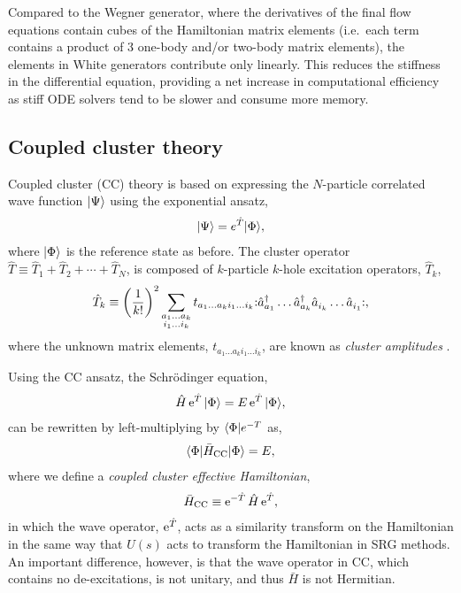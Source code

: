Compared to the Wegner generator, where the derivatives of the final flow equations contain cubes of the Hamiltonian matrix elements (i.e.\ each term contains a product of 3 one-body and/or two-body matrix elements), the elements in White generators contribute only linearly.  This reduces the stiffness in the differential equation, providing a net increase in computational efficiency as stiff ODE solvers tend to be slower and consume more memory.

\subsection{Coupled cluster theory}
\label{subsec:cctheory}

Coupled cluster (CC) theory is based on expressing the $N$-particle correlated wave function $| \Psi \rangle$ using the exponential ansatz,
\begin{align*}
  | \Psi \rangle = e^{\hat{T}} | \Phi \rangle,
\end{align*}
where $| \Phi \rangle$ is the reference state as before.  The cluster operator $\hat{T} \equiv \hat{T}_1 + \hat{T}_2 + \cdots + \hat{T}_N$, is composed of $k$-particle $k$-hole excitation operators, $\hat{T}_k$,
\begin{align} \label{eq:cc_amps}
  \hat{T}_k \equiv \left(\frac{1}{k!}\right)^2 \sum_{\substack{a_1 \ldots a_k \\ i_1 \ldots i_k}} t_{a_1 \ldots a_k i_1 \ldots i_k} \mathopen: \hat{a}_{a_1}^\dagger \ldots \hat{a}_{a_k}^\dagger \hat a_{i_k}^{} \ldots \hat{a}_{i_1}^{} \mathclose:,
\end{align}
where the unknown matrix elements, $t_{a_1 \ldots a_k i_1 \ldots i_k}$, are known as \textit{cluster amplitudes} \cite{shavitt2009many}.

Using the CC ansatz, the Schr\"odinger equation,
\begin{align} \label{eq:cc_schrodeq}
  \hat{H} \operatorname{e}^{\hat{T}} | \Phi \rangle = E \operatorname{e}^{\hat{T}} | \Phi \rangle,
\end{align}
can be rewritten by left-multiplying by $\langle \Phi |e^{-T}$ as,
\begin{align*}
  \langle \Phi | \bar{H}_{\mathrm{CC}} | \Phi \rangle = E,
\end{align*}
where we define a \textit{coupled cluster effective Hamiltonian},
\begin{align} \label{eq:cc_heff0}
  \bar{H}_{\mathrm{CC}} \equiv \operatorname{e}^{-\hat{T}} \hat{H} \operatorname{e}^{\hat{T}},
\end{align}
in which the wave operator, $\operatorname{e}^{\hat{T}}$, acts as a similarity transform on the Hamiltonian in the same way that $\hat{U}(s)$ acts to transform the Hamiltonian in SRG methods.  An important difference, however, is that the wave operator in CC, which contains no de-excitations, is not unitary, and thus $\bar{H}$ is not Hermitian.

